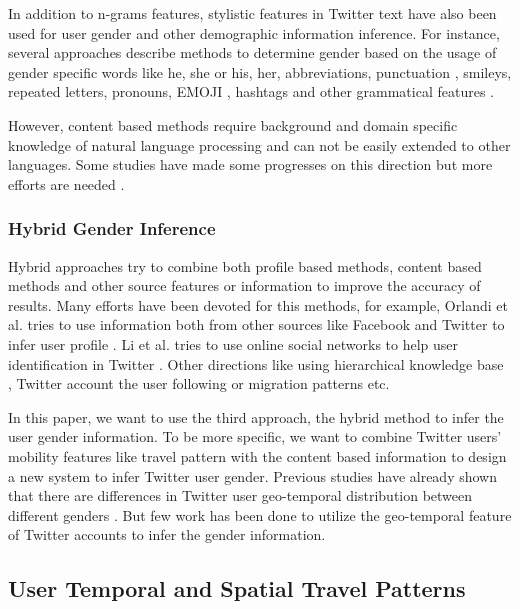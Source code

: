 \documentclass{article}
\begin{document}
In addition to n-grams features, stylistic features in Twitter text have also been used for user gender and other demographic information inference. For instance, several approaches describe methods to determine gender based on the usage of gender specific words like he, she or his, her, abbreviations, punctuation \cite{fink2012inferring}, smileys, repeated letters, pronouns, EMOJI \cite{wolf2000emotional} , hashtags and other grammatical features \cite{cheng2011author,ito2013he}.

However, content based methods require background  and domain specific knowledge of natural language processing and can not be easily extended to other languages. Some studies have made some progresses on this direction but more efforts are needed \cite{mozetivc2016multilingual}.

\subsubsection{Hybrid  Gender Inference}

Hybrid approaches try to combine both profile based methods, content based methods and other source features or information to improve the accuracy of results. Many efforts have been devoted for this methods, for example,  Orlandi et al. tries to use information both from other sources like Facebook and Twitter to infer user profile \cite{orlandi2012aggregated}. Li et al. tries to use online social networks to help user identification in Twitter \cite{li2017solution}. Other directions like using hierarchical knowledge base \cite{kapanipathi2014user},  Twitter account the user following \cite{chamberlain2016probabilistic} or migration patterns \cite{zagheni2014inferring} etc.

In this paper, we want to use the third approach, the hybrid method to infer the user gender information. To be more specific,  we want to combine Twitter users' mobility features like travel pattern with the content based information to design a new system to infer Twitter user gender. Previous studies have already shown that there are differences in Twitter user geo-temporal distribution between different genders \cite{graham2014world,mahmud2014home,weber2014visualizing, longley2016geo}. But few work has been done to utilize the geo-temporal feature of Twitter accounts to infer the gender information.

\subsection{User Temporal and Spatial Travel Patterns}
\end{document}
